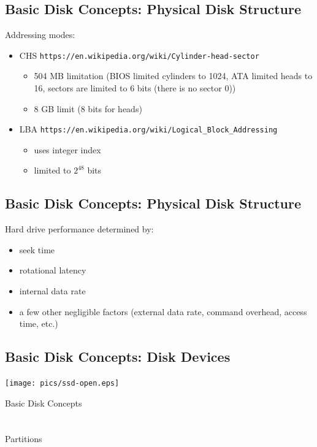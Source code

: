 \documentclass[xga]{xdvislides}
\begin{document}
\subsection{Basic Disk Concepts: Physical Disk Structure}
Addressing modes:
\begin{itemize}
	\item CHS {\tt https://en.wikipedia.org/wiki/Cylinder-head-sector}
		\begin{itemize}
			\item 504 MB limitation (BIOS limited cylinders to
				1024, ATA limited heads to 16, sectors are
				limited to 6 bits (there is no sector 0))
			\item 8 GB limit (8 bits for heads)
		\end{itemize}
	\item LBA {\tt https://en.wikipedia.org/wiki/Logical\_Block\_Addressing}
		\begin{itemize}
			\item uses integer index
			\item limited to $2^{48}$ bits
		\end{itemize}
\end{itemize}

\subsection{Basic Disk Concepts: Physical Disk Structure}
Hard drive performance determined by:
\begin{itemize}
	\item seek time
	\item rotational latency
	\item internal data rate
	\item a few other negligible factors (external data rate, command
		overhead, access time, etc.)
\end{itemize}

\subsection{Basic Disk Concepts: Disk Devices}
\begin{center}
	\texttt{[image: pics/ssd-open.eps]} \\
\end{center}


\newpage
\vspace*{\fill}
\begin{center}
	\Hugesize
		Basic Disk Concepts\\ [1em]
	\hspace*{5mm}
	\blueline\\
	\hspace*{5mm}\\
		Partitions
\end{center}
\vspace*{\fill}
\end{document}
